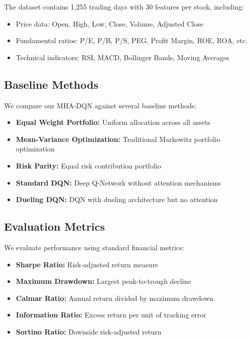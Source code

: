 \documentclass[11pt]{article}
\begin{document}
The dataset contains 1,255 trading days with 30 features per stock, including:
\begin{itemize}
    \item Price data: Open, High, Low, Close, Volume, Adjusted Close
    \item Fundamental ratios: P/E, P/B, P/S, PEG, Profit Margin, ROE, ROA, etc.
    \item Technical indicators: RSI, MACD, Bollinger Bands, Moving Averages
\end{itemize}

\subsection{Baseline Methods}

We compare our MHA-DQN against several baseline methods:

\begin{itemize}
    \item \textbf{Equal Weight Portfolio:} Uniform allocation across all assets
    \item \textbf{Mean-Variance Optimization:} Traditional Markowitz portfolio optimization
    \item \textbf{Risk Parity:} Equal risk contribution portfolio
    \item \textbf{Standard DQN:} Deep Q-Network without attention mechanisms
    \item \textbf{Dueling DQN:} DQN with dueling architecture but no attention
\end{itemize}

\subsection{Evaluation Metrics}

We evaluate performance using standard financial metrics:

\begin{itemize}
    \item \textbf{Sharpe Ratio:} Risk-adjusted return measure
    \item \textbf{Maximum Drawdown:} Largest peak-to-trough decline
    \item \textbf{Calmar Ratio:} Annual return divided by maximum drawdown
    \item \textbf{Information Ratio:} Excess return per unit of tracking error
    \item \textbf{Sortino Ratio:} Downside risk-adjusted return
\end{itemize}
\end{document}

